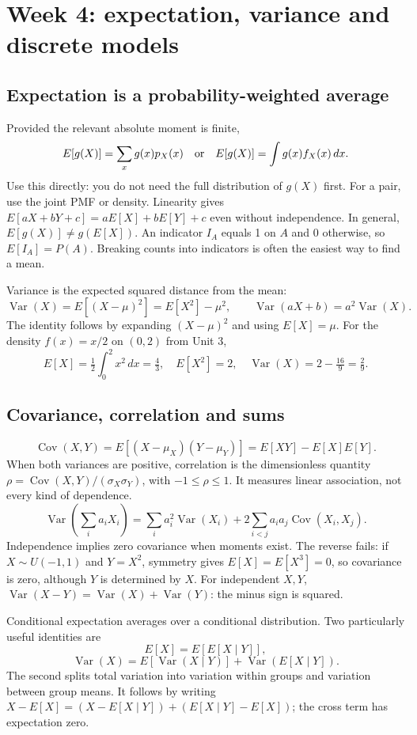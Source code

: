 \clearpage
\section{Week 4: expectation, variance and discrete models}
\subsection{Expectation is a probability-weighted average}
Provided the relevant absolute moment is finite,
\[
E[g(X)]=\sum_xg(x)p_X(x)\quad\hbox{or}\quad
E[g(X)]=\int g(x)f_X(x)\,dx.
\]
Use this directly: you do not need the full distribution of $g(X)$ first.
For a pair, use the joint PMF or density. Linearity gives
$E[aX+bY+c]=aE[X]+bE[Y]+c$ even without independence.
In general, $E[g(X)]\ne g(E[X])$.
An indicator $I_A$ equals 1 on $A$ and 0 otherwise, so $E[I_A]=P(A)$.
Breaking counts into indicators is often the easiest way to find a mean.

Variance is the expected squared distance from the mean:
\[
\operatorname{Var}(X)=E[(X-\mu)^2]=E[X^2]-\mu^2,\qquad
\operatorname{Var}(aX+b)=a^2\operatorname{Var}(X).
\]
The identity follows by expanding $(X-\mu)^2$ and using $E[X]=\mu$.
For the density $f(x)=x/2$ on $(0,2)$ from Unit 3,
\[
E[X]=\tfrac12\int_0^2x^2\,dx=\tfrac43,\quad
E[X^2]=2,\quad \operatorname{Var}(X)=2-\tfrac{16}9=\tfrac29.
\]

\subsection{Covariance, correlation and sums}
\[
\operatorname{Cov}(X,Y)=E[(X-\mu_X)(Y-\mu_Y)]
=E[XY]-E[X]E[Y].
\]
When both variances are positive, correlation is the dimensionless quantity
$\rho=\operatorname{Cov}(X,Y)/(\sigma_X\sigma_Y)$, with $-1\leq\rho\leq1$.
It measures linear association, not every kind of dependence.
\[
\operatorname{Var}\!\left(\sum_i a_iX_i\right)
=\sum_i a_i^2\operatorname{Var}(X_i)
+2\sum_{i<j}a_ia_j\operatorname{Cov}(X_i,X_j).
\]
Independence implies zero covariance when moments exist. The reverse fails:
if $X\sim U(-1,1)$ and $Y=X^2$, symmetry gives $E[X]=E[X^3]=0$, so covariance
is zero, although $Y$ is determined by $X$.
For independent $X,Y$, $\operatorname{Var}(X-Y)=\operatorname{Var}(X)+
\operatorname{Var}(Y)$: the minus sign is squared.

Conditional expectation averages over a conditional distribution. Two
particularly useful identities are
\[
E[X]=E[E[X\mid Y]],
\]
\[
\operatorname{Var}(X)=E[\operatorname{Var}(X\mid Y)]
+\operatorname{Var}(E[X\mid Y]).
\]
The second splits total variation into variation within groups and
variation between group means. It follows by writing
$X-E[X]=(X-E[X\mid Y])+(E[X\mid Y]-E[X])$; the cross term has expectation zero.

